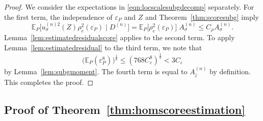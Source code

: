 \documentclass[aos]{imsart}
\newcommand{\E}{\mathbb{E}}
\begin{document}
\begin{proof}
		We consider the expectations in \eqref{eqn:locscalesubgdecomp} separately. For the first term, the independence of $\varepsilon_P$ and $Z$ and Theorem~\ref{thm:scoresubg} imply \begin{equation*}
			\E_P\big[u_\sigma^{(n)2}(Z) \rho_{e}^2(\varepsilon_P) \; \big|\; D^{(n)}\big] = \E_P\big[\rho_{e}^2(\varepsilon_P)\big] \; A_\sigma^{(n)} \leq C_\rho A_\sigma^{(n)}. 
		\end{equation*} Lemma~\ref{lem:estimatedresidualscore} applies to the second term. To apply Lemma~\ref{lem:estimatedresidual} to the third term, we note that \begin{equation*}
			\big(\E_P(\varepsilon_P^8)\big)^{\frac18} \leq (768 C_\varepsilon^8)^{\frac18} < 3C_\varepsilon
		\end{equation*}
		by Lemma~\ref{lem:subgmoment}. The fourth term is equal to $A_{\hat\varepsilon}^{(n)}$ by definition. This completes the proof.
	\end{proof}

    \subsection{Proof of Theorem~\ref{thm:homscoreestimation}}
	
\end{document}
